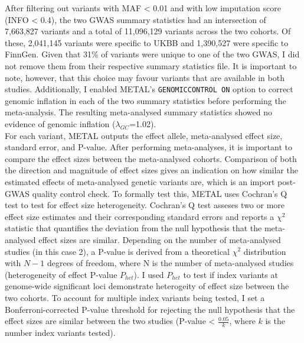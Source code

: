 After filtering out variants with MAF < 0.01 and with low imputation score (INFO < 0.4), the two GWAS summary statistics had an intersection of 7,663,827 variants and a total of 11,096,129 variants across the two cohorts. Of these, 2,041,145 variants were specific to UKBB and 1,390,527 were specific to FinnGen. Given that 31\% of variants were unique to one of the two GWAS, I did not remove them from their respective summary statistics file. It is important to note, however, that this choice may favour variants that are available in both studies. Additionally, I enabled METAL's \Verb+GENOMICCONTROL ON+ option to correct genomic inflation in each of the two summary statistics before performing the meta-analysis. The resulting meta-analysed summary statistics showed no evidence of genomic inflation ($\lambda_{GC}$=1.02).\\

For each variant, METAL outputs the effect allele, meta-analysed effect size, standard error, and P-value. After performing meta-analyses, it is important to compare the effect sizes between the meta-analysed cohorts. Comparison of both the direction and magnitude of effect sizes gives an indication on how similar the estimated effects of meta-analysed genetic variants are, which is an import post-GWAS quality control check. To formally test this, METAL uses Cochran's Q test to test for effect size heterogeneity. Cochran's Q test asseses two or more effect size estimates and their corresponding standard errors and reports a $\chi^{2}$ statistic that quantifies the deviation from the null hypothesis that the meta-analysed effect sizes are similar. Depending on the number of meta-analysed studies (in this case 2), a P-value is derived from a theoretical $\chi^{2}$ distribution with $N-1$ degrees of freedom, where N is the number of meta-analysed studies (heterogeneity of effect P-value $P_{het}$). I used $P_{het}$ to test if index variants at genome-wide significant loci demonstrate heterogeity of effect size between the two cohorts. To account for multiple index variants being tested, I set a Bonferroni-corrected P-value threshold for rejecting the null hypothesis that the effect sizes are similar between the two studies (P-value < $\frac{0.05}{k}$, where $k$ is the number index variants tested).


